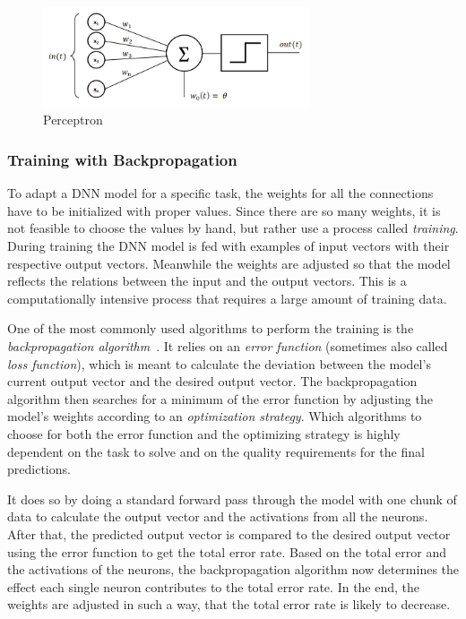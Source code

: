 \begin{figure}[h]
    \centering
    \includegraphics[width=0.7\textwidth]{images/perceptron}
    \caption{Perceptron}
    \label{fig:perceptron}
\end{figure}

\subsubsection{Training with Backpropagation}
To adapt a DNN model for a specific task, the weights for all the connections have to be initialized with proper values. Since there are so many weights, it is not feasible to choose the values by hand, but rather use a process called \emph{training}. During training the DNN model is fed with examples of input vectors with their respective output vectors. Meanwhile the weights are adjusted so that the model reflects the relations between the input and the output vectors. This is a computationally intensive process that requires a large amount of training data.

One of the most commonly used algorithms to perform the training is the \emph{backpropagation algorithm}~\cite[pp.~151ff]{nn_intro96}. It relies on an \emph{error function} (sometimes also called \emph{loss function}), which is meant to calculate the deviation between the model's current output vector and the desired output vector. The backpropagation algorithm
 then searches for a minimum of the error function by adjusting the model's weights according to an \emph{optimization strategy}. Which algorithms to choose for both the error function and the optimizing strategy is highly dependent on the task to solve and on the quality requirements for the final predictions.

It does so by doing a standard forward pass through the model with one chunk of data to calculate the output vector and the activations from all the neurons. After that, the predicted output vector is compared to the desired output vector using the error function to get the total error rate. Based on the total error and the activations of the neurons, the backpropagation algorithm now determines the effect each single neuron contributes to the total error rate. In the end, the weights are adjusted in such a way, that the total error rate is likely to decrease.

